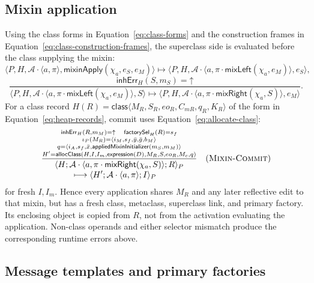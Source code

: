 \documentclass[11pt]{article}
\numberwithin{equation}{section}
\newcommand{\kw}[1]{\ensuremath{\mathsf{#1}}}
\newcommand{\undef}{\mathord{\uparrow}}
\newcommand{\rulelabel}[1]{\textsc{#1}}
\begin{document}
\subsection{Mixin application}

Using the class forms in Equation~\eqref{eq:class-forms} and the construction
frames in Equation~\eqref{eq:class-construction-frames}, the superclass side is
evaluated before the class supplying the mixin:
\begin{equation}\label{eq:mixin-start}
 \langle P,H,\mathcal A\cdot\langle a,\pi\rangle,
   \kw{mixinApply}(\chi_a,e_S,e_M)\rangle
 \longmapsto
 \langle P,H,\mathcal A\cdot
   \langle a,\pi\cdot\kw{mixLeft}(\chi_a,e_M)\rangle,e_S\rangle,
\end{equation}
\begin{equation}\label{eq:mixin-right}
\dfrac{\mathsf{inhErr}_H(S,m_S)=\undef}
 {\langle P,H,\mathcal A\cdot
    \langle a,\pi\cdot\kw{mixLeft}(\chi_a,e_M)\rangle,S\rangle
  \longmapsto
  \langle P,H,\mathcal A\cdot
    \langle a,\pi\cdot\kw{mixRight}(\chi_a,S)\rangle,e_M\rangle}.
\end{equation}
For a class record $H(R)=\kw{class}\langle M_R,S_R,eo_R,C_{mR},q_R,K_R\rangle$ of
the form in Equation~\eqref{eq:heap-records}, commit uses
Equation~\eqref{eq:allocate-class}:
\[
\dfrac{\substack{\mathsf{inhErr}_H(R,m_M)=\undef\quad
       \mathsf{factorySel}_H(R)=s_f\\
       \iota_P(M_R)=\langle i_M,s_f,\bar y,\bar g,b_M\rangle\\
       q=\langle i_A,s_f,\bar x,\kw{appliedMixinInitializer}(m_S,m_M)\rangle\\
       H'=\mathsf{allocClass}(H,I,I_m,\kw{expression}(D),M_R,S,eo_R,M_c,q)}}
 {\begin{aligned}
  &\langle H;\mathcal A\cdot\langle a,
       \pi\cdot\kw{mixRight}(\chi_a,S)\rangle;R\rangle_P\\[-1mm]
  &\qquad\longmapsto
   \langle H';\mathcal A\cdot\langle a,\pi\rangle;I\rangle_P
 \end{aligned}}
\quad(\rulelabel{Mixin-Commit})
\]
for fresh $I,I_m$.  Hence every application shares $M_R$ and any later
reflective edit to that mixin, but has a fresh class, metaclass, superclass
link, and primary factory.  Its enclosing object is copied from $R$, not from
the activation evaluating the application.  Non-class operands and either
selector mismatch produce the corresponding runtime errors above.

\subsection{Message templates and primary factories}
\end{document}
